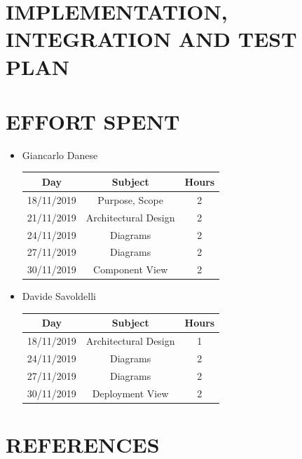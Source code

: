 \documentclass[12pt,a4paper]{article}
\begin{document}
\section{IMPLEMENTATION, INTEGRATION AND TEST PLAN}
\section{EFFORT SPENT}
\begin{itemize}
		\item Giancarlo Danese
		\begin{center}
			\begin{tabular}{| c | c | c |}
				\hline
				Day & Subject & Hours \\ \hline
				18/11/2019 & Purpose, Scope & 2 \\
				21/11/2019 & Architectural Design & 2\\
				24/11/2019 & Diagrams & 2\\
				27/11/2019 & Diagrams & 2\\
				30/11/2019 & Component View & 2\\
				\hline
			\end{tabular}
		\end{center}

		\item Davide Savoldelli
		\begin{center}
			\begin{tabular}{| c | c | c |}
				\hline
				Day & Subject & Hours \\ \hline
				18/11/2019 & Architectural Design & 1 \\
				24/11/2019 & Diagrams & 2 \\
				27/11/2019 & Diagrams & 2 \\
				30/11/2019 & Deployment View & 2\\
				\hline
			\end{tabular}
		\end{center}
	\end{itemize}
\section{REFERENCES}
\end{document}

